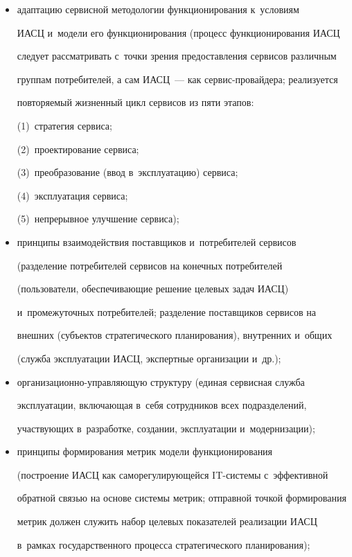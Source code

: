 \begin{itemize}


\item адаптацию сервисной методологии функционирования к~условиям 


ИАСЦ и~модели его функционирования (процесс функционирования ИАСЦ 


следует рассматривать с~точки зрения предоставления сервисов различным 


группам потребителей, а сам ИАСЦ~--- как сервис-провайдера; реализуется 


повторяемый жизненный цикл сервисов из пяти этапов:


(1)~стратегия сервиса; 


(2)~проектирование сервиса; 


(3)~преобразование (ввод в~эксплуатацию) сервиса; 


(4)~эксплуатация сервиса; 


(5)~непрерывное улучшение сервиса);


\item принципы взаимодействия поставщиков и~потребителей сервисов 


(разделение потребителей сервисов на конечных потребителей 


(пользователи, обеспечивающие решение целевых задач ИАСЦ) 


и~промежуточных потребителей; разделение поставщиков сервисов на 


внешних (субъектов стратегического планирования), внутренних и~общих 


(служба эксплуатации ИАСЦ, экспертные организации и~др.);


\item организационно-управляющую структуру (единая сервисная служба 


эксплуатации, включающая в~себя сотрудников всех подразделений, 


участвующих в~разработке, создании, эксплуатации и~модернизации);


\item принципы формирования метрик модели функционирования 


(построение ИАСЦ как саморегулирующейся IT-сис\-те\-мы с~эффективной 


обратной \mbox{связью} на основе системы метрик; отправной точкой формирования 


метрик должен служить набор целевых показателей реализации ИАСЦ 


в~рамках государственного процесса стратегического планирования);



\end{itemize}
